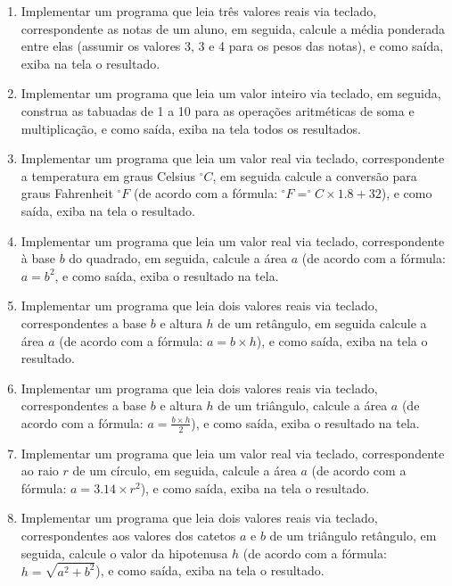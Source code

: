 \documentclass[11pt]{article}
\begin{document}
\begin{enumerate}
	\item Implementar um programa que leia três valores reais via teclado, correspondente as notas de
	um aluno, em seguida, calcule a média ponderada entre elas (assumir os valores 3, 3 e 4 para os
	pesos das notas), e como saída, exiba na tela o resultado.
	
	\item  Implementar um programa que leia um valor inteiro via teclado, em seguida, construa as tabuadas
	de 1 a 10 para as operações aritméticas de soma e multiplicação, e como saída, exiba na tela
	todos os resultados.
	
	\item Implementar um programa que leia um valor real via teclado, correspondente a temperatura em
	graus Celsius $^{\circ}C$, em seguida calcule a conversão para graus Fahrenheit $^{\circ}F$ (de acordo com a fórmula:
	$^{\circ}F = ^{\circ}C \times 1.8 + 32$), e como saída, exiba na tela o resultado.
	
	\item Implementar um programa que leia um valor real via teclado, correspondente à base $b$ do
	quadrado, em seguida, calcule a área $a$ (de acordo com a fórmula: $a = b^{2}$, e como saída, exiba o
	resultado na tela.
	
	\item Implementar um programa que leia dois valores reais via teclado, correspondentes a base $b$ e
	altura $h$ de um retângulo, em seguida calcule a área $a$ (de acordo com a fórmula: $a = b \times h$), e
	como saída, exiba na tela o resultado.
	
	\item  Implementar um programa que leia dois valores reais via teclado, correspondentes a base $b$ e
	altura $h$ de um triângulo, calcule a área $a$ (de acordo com a fórmula: $a = \frac{b \times h}{2}$), e como saída,
	exiba o resultado na tela.
	
	\item  Implementar um programa que leia um valor real via teclado, correspondente ao raio $r$ de um
	círculo, em seguida, calcule a área $a$ (de acordo com a fórmula: $a = 3.14 \times r^{2}$), e como saída,
	exiba na tela o resultado.
	
	\item Implementar um programa que leia dois valores reais via teclado, correspondentes aos valores dos
	catetos $a$ e $b$ de um triângulo retângulo, em seguida, calcule o valor da hipotenusa $h$ (de acordo
	com a fórmula: $h = \sqrt{a^{2} + b^{2}}$), e como saída, exiba na tela o resultado.
	

\end{enumerate}
\end{document}
